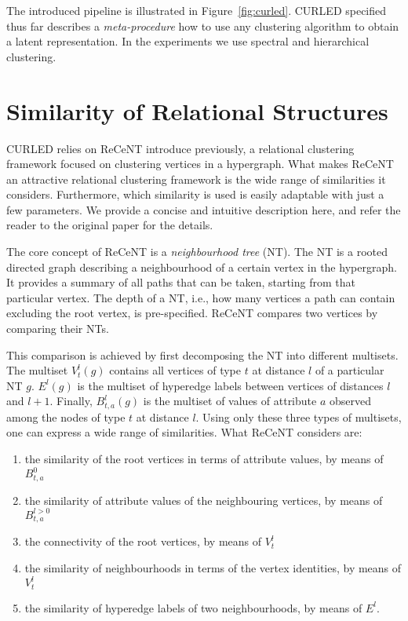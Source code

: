  
The introduced pipeline is illustrated in Figure~\ref{fig:curled}.
CURLED specified thus far describes a \textit{meta-procedure} how to use any clustering algorithm to obtain a latent representation.
In the experiments we use spectral and hierarchical clustering.



\section{Similarity of Relational Structures}
\label{sec:Clustering}


CURLED relies on ReCeNT introduce previously, a relational clustering framework focused on clustering vertices in a hypergraph.
What makes ReCeNT an attractive relational clustering framework is the wide range of similarities it considers.
Furthermore, which similarity is used is easily adaptable with just a few parameters.
We provide a concise and intuitive description here, and refer the reader to the original paper for the details.


The core concept of ReCeNT is a \textit{neighbourhood tree} (NT).
The NT is a rooted directed graph describing a neighbourhood of a certain vertex in the hypergraph.
It provides a summary of all paths that can be taken, starting from that particular vertex.
The depth of a NT, i.e., how many vertices a path can contain excluding the root vertex, is pre-specified.
ReCeNT compares two vertices by comparing their NTs.



This comparison is achieved by first decomposing the NT into different multisets.
The multiset $V^l_{t}(g)$ contains all vertices of type $t$ at distance $l$ of a particular NT $g$.
$E^l(g)$ is the multiset of hyperedge labels between vertices of distances $l$ and $l+1$.
Finally, $B^l_{t,a}(g)$ is the multiset of values of attribute $a$ observed among the nodes of type $t$ at distance $l$.
Using only these three types of multisets, one can express a wide range of similarities.
What ReCeNT considers are:
\begin{enumerate}
    \item the similarity of the root vertices in terms of attribute values, by means of $B^0_{t,a}$ 
    \item the similarity of attribute values of the neighbouring vertices, by means of $B^{l>0}_{t,a}$ 
    \item the connectivity of the root vertices, by means of $V^l_t$ 
    \item the similarity of neighbourhoods in terms of the vertex identities, by means of $V^l_t$ 
    \item the similarity of hyperedge labels of two neighbourhoods, by means of $E^l$.
\end{enumerate}


